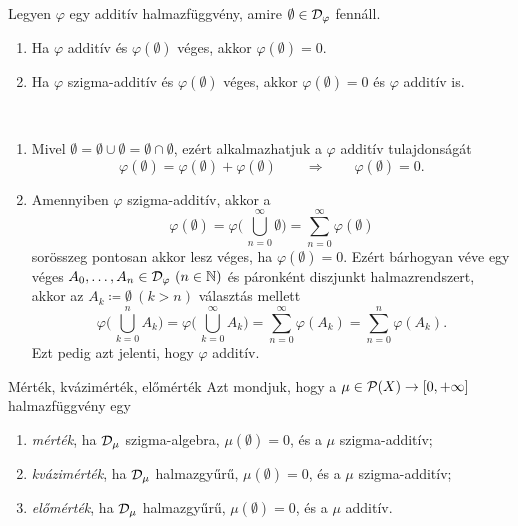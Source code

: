 \documentclass[
]{elteikthesis}[2024/04/26]
\begin{document}
	\begin{stat*}
		Legyen \( \varphi \) egy additív halmazfüggvény, 
		amire \( \emptyset \in \mathcal{D}_{\varphi} \) fennáll.
		\begin{enumerate}
			\item Ha \( \varphi \) additív és \( \varphi(\emptyset) \) véges, 
			akkor \( \varphi(\emptyset) = 0 \).
			
			\item Ha \( \varphi \) szigma-additív és \( \varphi(\emptyset) \) véges, 
			akkor \( \varphi(\emptyset) = 0 \) és \( \varphi \) additív is.
		\end{enumerate}
	\end{stat*}
	\begin{proof*}\,
		\begin{enumerate}
			\item Mivel \( \emptyset = \emptyset \cup \emptyset = \emptyset \cap \emptyset \), ezért alkalmazhatjuk a \( \varphi \) additív tulajdonságát
			\[
				\varphi(\emptyset) = 
				\varphi(\emptyset) + \varphi(\emptyset)
				\qquad \Longrightarrow \qquad
				\varphi(\emptyset) = 0.
			\]
			
			\item Amennyiben \( \varphi \) szigma-additív, akkor a
			\[
				\varphi(\emptyset) =
				\varphi \Biggl(\, \bigcup_{n=0}^\infty \emptyset \Biggr) =
				\sum_{n=0}^{\infty} \varphi(\emptyset)
			\]
			sorösszeg pontosan akkor lesz véges, ha \( \varphi(\emptyset) = 0 \).
			Ezért bárhogyan véve egy véges \( A_0, \dots, A_n \in \mathcal{D}_{\varphi}\ (n \in \mathbb{N}) \) és páronként diszjunkt halmazrendszert, akkor az 
			\( A_k \coloneq \emptyset \ (k > n) \) választás mellett
			\[
				\varphi \Biggl(\, \bigcup_{k=0}^n        A_k \Biggr) =
				\varphi \Biggl(\, \bigcup_{k=0}^{\infty} A_k \Biggr) =
				\sum_{n=0}^{\infty} \varphi(A_k) =
				\sum_{n=0}^n        \varphi(A_k).
			\]
			Ezt pedig azt jelenti, hogy \( \varphi \) additív.
		\end{enumerate}
	\end{proof*}
	
	\begin{definition}{Mérték, kvázimérték, előmérték}{}
		Azt mondjuk, hogy a \( \mu \in \mathcal{P}( X ) \to [0, +\infty] \) halmazfüggvény egy
		\begin{enumerate}
			\item \emph{mérték}, ha \( \mathcal{D}_{\mu} \) szigma-algebra, \( \mu(\emptyset) = 0 \), és a \( \mu \) szigma-additív;
			
			\item \emph{kvázimérték}, ha \( \mathcal{D}_{\mu} \) halmazgyűrű, 
			\( \mu(\emptyset) = 0 \), és a \( \mu \) szigma-additív;
			
			\item \emph{előmérték}, ha \( \mathcal{D}_{\mu} \) halmazgyűrű, 
			\( \mu(\emptyset) = 0 \), és a \( \mu \) additív.
		\end{enumerate}
	\end{definition}
	
\end{document}
